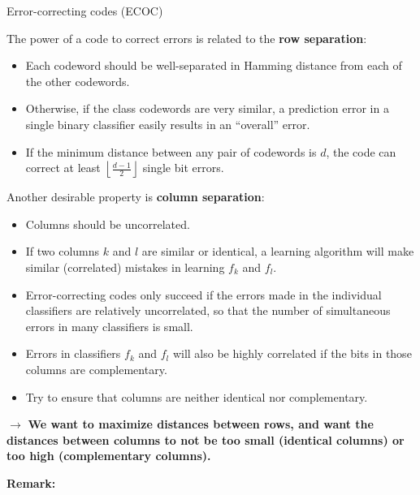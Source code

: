 \documentclass[11pt,compress,t,notes=noshow, xcolor=table]{beamer}
\begin{document}
\begin{vbframe}{Error-correcting codes (ECOC)}

The power of a code to correct errors is related to the \textbf{row separation}:

\begin{itemize}
  \item Each codeword should be well-separated in Hamming distance from each of the other codewords. 
  \item Otherwise, if the class codewords are very similar, a prediction error in a single binary classifier easily results in an \enquote{overall} error.
  \item If the minimum distance between any pair of codewords is $d$, the code can correct at least $\left\lfloor \frac{d - 1}{2}\right\rfloor$ single bit errors. 
\end{itemize}

\framebreak

Another desirable property is \textbf{column separation}:

\begin{itemize}
  \item Columns should be uncorrelated.
  \item If two columns $k$ and $l$ are similar or identical, a learning algorithm will make similar (correlated) mistakes in learning $f_k$ and $f_l$.
  \item Error-correcting codes only succeed if the errors made in the individual classifiers are relatively uncorrelated, so that the number of simultaneous errors in many classifiers is small. 
  \item Errors in classifiers $f_k$ and $f_l$ will also be highly correlated if the bits in those columns are complementary. 
  \item Try to ensure that columns are neither identical nor complementary.
\end{itemize}

  $\to$ \textbf{We want to maximize distances between rows, and want the distances between columns to not be too small (identical columns) or too high (complementary columns).} 


\framebreak 

\textbf{Remark:}


\end{vbframe}
\end{document}
